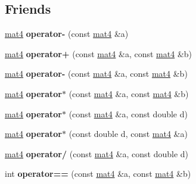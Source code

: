 \subsection*{Friends}
\begin{DoxyCompactItemize}
\item 
\hypertarget{classmat4_a2688c02473adf7c7d9064f4ba6bca442}{
\hyperlink{classmat4}{mat4} {\bfseries operator-\/} (const \hyperlink{classmat4}{mat4} \&a)}
\label{classmat4_a2688c02473adf7c7d9064f4ba6bca442}

\item 
\hypertarget{classmat4_ae376b416e75ef751d5c8cf206a5dfa82}{
\hyperlink{classmat4}{mat4} {\bfseries operator+} (const \hyperlink{classmat4}{mat4} \&a, const \hyperlink{classmat4}{mat4} \&b)}
\label{classmat4_ae376b416e75ef751d5c8cf206a5dfa82}

\item 
\hypertarget{classmat4_a3bd059d47c48840d752d73393740159a}{
\hyperlink{classmat4}{mat4} {\bfseries operator-\/} (const \hyperlink{classmat4}{mat4} \&a, const \hyperlink{classmat4}{mat4} \&b)}
\label{classmat4_a3bd059d47c48840d752d73393740159a}

\item 
\hypertarget{classmat4_a15e77864e523807c2e4d9172f58cc96b}{
\hyperlink{classmat4}{mat4} {\bfseries operator$\ast$} (const \hyperlink{classmat4}{mat4} \&a, const \hyperlink{classmat4}{mat4} \&b)}
\label{classmat4_a15e77864e523807c2e4d9172f58cc96b}

\item 
\hypertarget{classmat4_ad7169ec91a1e9777458b3853c62e65d6}{
\hyperlink{classmat4}{mat4} {\bfseries operator$\ast$} (const \hyperlink{classmat4}{mat4} \&a, const double d)}
\label{classmat4_ad7169ec91a1e9777458b3853c62e65d6}

\item 
\hypertarget{classmat4_af2b2a5abac3ab2f9b152f54201d23ed3}{
\hyperlink{classmat4}{mat4} {\bfseries operator$\ast$} (const double d, const \hyperlink{classmat4}{mat4} \&a)}
\label{classmat4_af2b2a5abac3ab2f9b152f54201d23ed3}

\item 
\hypertarget{classmat4_a29f0db6dbc0e8408abc08599a6027dca}{
\hyperlink{classmat4}{mat4} {\bfseries operator/} (const \hyperlink{classmat4}{mat4} \&a, const double d)}
\label{classmat4_a29f0db6dbc0e8408abc08599a6027dca}

\item 
\hypertarget{classmat4_a7d8eba33162a18dd2b9538162fc890f3}{
int {\bfseries operator==} (const \hyperlink{classmat4}{mat4} \&a, const \hyperlink{classmat4}{mat4} \&b)}
\label{classmat4_a7d8eba33162a18dd2b9538162fc890f3}


\end{DoxyCompactItemize}
